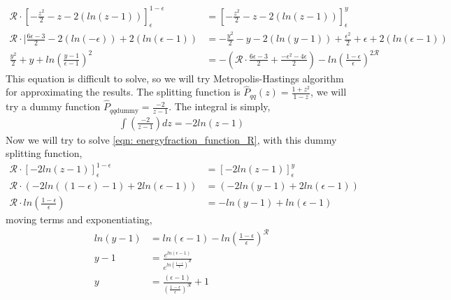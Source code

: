 \documentclass[main.tex]{subfiles}
\begin{document}
\begin{align}
    \mathcal{R} \cdot \left[-\frac{z^2}{2} - z - 2\left( ln(z-1)\right) \right]_\epsilon^{1-\epsilon} &= \left[-\frac{z^2}{2} - z - 2\left( ln(z-1)\right) \right]_\epsilon^{y} \nonumber \\
    \mathcal{R}\cdot|  \frac{6 \epsilon-3}{2} - 2 ( ln(-\epsilon)) + 2 ( ln(\epsilon-1)) &= -\frac{y^2}{2} - y - 2 ( ln(y-1)) +\frac{\epsilon^2}{2} + \epsilon + 2 ( ln(\epsilon-1)) \nonumber\\
    \frac{y^2}{2} + y + ln \left( \frac{y-1}{\epsilon-1}\right)^2  &= -\left(\mathcal{R} \cdot \frac{6 \epsilon-3}{2} + \frac{-\epsilon^2-4 \epsilon}{2}\right) - ln\left(\frac{1-\epsilon}{\epsilon}\right)^{2\mathcal{R}}
\end{align}
This equation is difficult to solve, so we will try Metropolis-Hastings algorithm for approximating the results.
The \qqg splitting function is \(\hat{P}_{qq}(z) = \frac{1+z^2}{1-z}\), we will try a dummy function \(\hat{P}_{qq \text{dummy}} = \frac{-2}{z-1}\).
The integral is simply,
\begin{align}
    \int(\frac{-2}{z-1})dz = -2 ln(z-1)
\end{align}
Now we will try to solve \autoref{eqn: energyfraction_function_R}, with this dummy splitting function, 
\begin{align}
    \mathcal{R}\cdot \left[-2 ln(z-1)\right]_{\epsilon}^{1-\epsilon} &= \left[-2 ln(z-1)\right]_{\epsilon}^{y} \nonumber \\
    \mathcal{R}\cdot \left(-2 ln((1-\epsilon)-1) + 2 ln(\epsilon-1) \right) &= \left(-2 ln(y-1) + 2 ln(\epsilon-1) \right) \nonumber \\
    \mathcal{R}\cdot ln\left(\frac{1-\epsilon}{\epsilon} \right) &= - ln(y-1) + ln(\epsilon-1)
\end{align}
moving terms and exponentiating, 
\begin{align}
    ln(y-1) &= ln(\epsilon-1) - ln\left(\frac{1-\epsilon}{\epsilon} \right)^{\mathcal{R}} \nonumber \\
    y-1 &= \frac{e^{ln(\epsilon-1)}}{e^{ln(\frac{1-\epsilon}{\epsilon})^{\mathcal{R}}}} \nonumber \\
    y &= \frac{(\epsilon-1)}{(\frac{1-\epsilon}{\epsilon})^{\mathcal{R}}} +1
\end{align}
\end{document}
